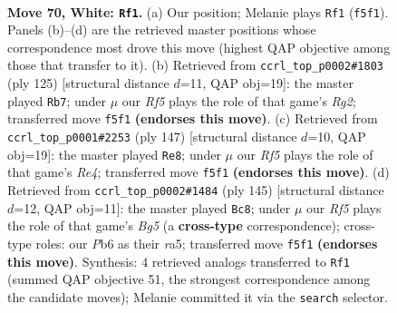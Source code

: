 \documentclass[11pt]{article}
\begin{document}
\clearpage

\begin{figure}[p]\centering
\begin{subfigure}{0.46\textwidth}\centering
\resizebox{\linewidth}{!}{%
\newchessgame
\chessboard[
  setfen={7k/8/1P5n/P4R2/8/K7/7r/8 w - - 3 70},
  showmover=false,
  pgfstyle=straightmove, color=movearrow, markmove={f5-f1}
]}
\caption{}
\end{subfigure}\hfill
\begin{subfigure}{0.46\textwidth}\centering
\resizebox{\linewidth}{!}{%
\newchessgame
\chessboard[
  setfen={R3N3/6rk/5p2/4p3/8/4K3/8/8 b - - 7 63},
  showmover=false,
  pgfstyle=straightmove, color=movearrow, markmove={g7-b7}
]}
\caption{}
\end{subfigure}
\\[4pt]
\begin{subfigure}{0.46\textwidth}\centering
\resizebox{\linewidth}{!}{%
\newchessgame
\chessboard[
  setfen={8/2k5/8/4r1p1/3p4/3N4/3K4/1R6 b - - 3 74},
  showmover=false,
  pgfstyle=straightmove, color=movearrow, markmove={e5-e8}
]}
\caption{}
\end{subfigure}\hfill
\begin{subfigure}{0.46\textwidth}\centering
\resizebox{\linewidth}{!}{%
\newchessgame
\chessboard[
  setfen={8/5k2/2r4p/R7/3K2b1/8/5N2/8 b - - 3 73},
  showmover=false,
  pgfstyle=straightmove, color=movearrow, markmove={g4-c8}
]}
\caption{}
\end{subfigure}
\caption{\textbf{Move 70, White: \texttt{Rf1}.} (a) Our position; Melanie plays \texttt{Rf1} (\texttt{f5f1}). Panels (b)--(d) are the retrieved master positions whose correspondence most drove this move (highest QAP objective among those that transfer to it). (b) Retrieved from \texttt{ccrl\_top\_p0002\#1803} (ply 125) [structural distance $d$=11, QAP obj=19]: the master played \texttt{Rb7}; under $\mu$ our \emph{Rf5} plays the role of that game's \emph{Rg2}; transferred move \texttt{f5f1} \textbf{(endorses this move)}. (c) Retrieved from \texttt{ccrl\_top\_p0001\#2253} (ply 147) [structural distance $d$=10, QAP obj=19]: the master played \texttt{Re8}; under $\mu$ our \emph{Rf5} plays the role of that game's \emph{Re4}; transferred move \texttt{f5f1} \textbf{(endorses this move)}. (d) Retrieved from \texttt{ccrl\_top\_p0002\#1484} (ply 145) [structural distance $d$=12, QAP obj=11]: the master played \texttt{Bc8}; under $\mu$ our \emph{Rf5} plays the role of that game's \emph{Bg5} (a \textbf{cross-type} correspondence); cross-type roles: our \emph{P}b6 as their \emph{r}a5; transferred move \texttt{f5f1} \textbf{(endorses this move)}. Synthesis: 4 retrieved analogs transferred to \texttt{Rf1} (summed QAP objective 51, the strongest correspondence among the candidate moves); Melanie committed it via the \texttt{search} selector.}
\label{fig:thought-m138}
\end{figure}
\end{document}
